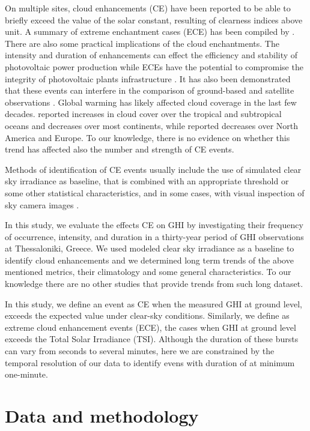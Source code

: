 \documentclass[preprint, 5p,
authoryear]{elsarticle} %
\begin{document}
On multiple sites, cloud enhancements (CE) have been reported to be able
to briefly exceed the value of the solar constant, resulting of
clearness indices above unit. A summary of extreme enchantment cases
(ECE) has been compiled by \citet{Martins2022}. There are also some
practical implications of the cloud enchantments. The intensity and
duration of enhancements can effect the efficiency and stability of
photovoltaic power production \citep{Lappalainen2020, Jaervelae2020}
while ECEs have the potential to compromise the integrity of
photovoltaic plants infrastructure \citep{DoNascimento2019}. It has also
been demonstrated that these events can interfere in the comparison of
ground-based and satellite observations \citep{Damiani2018}. Global
warming has likely affected cloud coverage in the last few decades.
\citet{Liu2023} reported increases in cloud cover over the tropical and
subtropical oceans and decreases over most continents, while
\citet{Dong2023} reported decreases over North America and Europe. To
our knowledge, there is no evidence on whether this trend has affected
also the number and strength of CE events.

Methods of identification of CE events usually include the use of
simulated clear sky irradiance as baseline, that is combined with an
appropriate threshold or some other statistical characteristics, and in
some cases, with visual inspection of sky camera images \citep[ and
references therein]{Vamvakas2020, Mol2023}.

In this study, we evaluate the effects CE on GHI by investigating their
frequency of occurrence, intensity, and duration in a thirty-year period
of GHI observations at Thessaloniki, Greece. We used modeled clear sky
irradiance as a baseline to identify cloud enhancements and we
determined long term trends of the above mentioned metrics, their
climatology and some general characteristics. To our knowledge there are
no other studies that provide trends from such long dataset.

In this study, we define an event as CE when the measured GHI at ground
level, exceeds the expected value under clear-sky conditions. Similarly,
we define as extreme cloud enhancement events (ECE), the cases when GHI
at ground level exceeds the Total Solar Irradiance (TSI). Although the
duration of these bursts can vary from seconds to several minutes, here
we are constrained by the temporal resolution of our data to identify
evens with duration of at minimum one-minute.

\hypertarget{data-and-methodology}{%
\section{Data and methodology}\label{data-and-methodology}}
\end{document}
